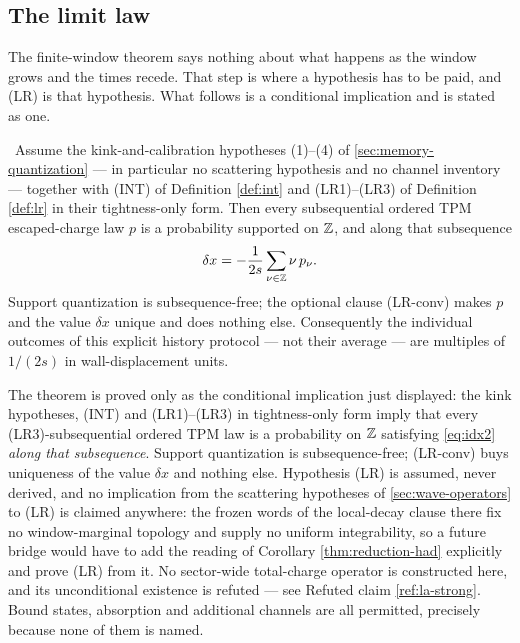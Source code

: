 \subsection{The limit law}

The finite-window theorem says nothing about what happens as the window grows
and the times recede. That step is where a hypothesis has to be paid, and
(LR) is that hypothesis. What follows is a conditional implication and is
stated as one.

\begin{theorem}
\label{thm:spec}
\statusProvedConditional\
Assume the kink-and-calibration hypotheses (1)--(4) of
\cref{sec:memory-quantization} --- in particular no scattering hypothesis and
no channel inventory --- together with (INT) of Definition \ref{def:int} and
(LR1)--(LR3) of Definition \ref{def:lr} in their tightness-only form. Then
every subsequential ordered TPM escaped-charge law $p$ is a probability
supported on $\mathbb{Z}$, and along that subsequence
\begin{equation}
  \delta x=-\frac{1}{2s}\sum_{\nu\in\mathbb{Z}}\nu\,p_\nu .
  \label{eq:idx2}
\end{equation}
Support quantization is subsequence-free; the optional clause (LR-conv) makes
$p$ and the value $\delta x$ unique and does nothing else. Consequently the
individual outcomes of this explicit history protocol --- not their average
--- are multiples of $1/(2s)$ in wall-displacement units.
\end{theorem}

\begin{scope}
The theorem is proved only as the conditional implication just displayed:
the kink hypotheses, (INT) and (LR1)--(LR3) in tightness-only form imply that
every (LR3)-subsequential ordered TPM law is a probability on $\mathbb{Z}$ satisfying
\eqref{eq:idx2} \emph{along that subsequence}. Support quantization is
subsequence-free; (LR-conv) buys uniqueness of the value $\delta x$ and
nothing else. Hypothesis (LR) is assumed, never derived, and no implication
from the scattering hypotheses of \cref{sec:wave-operators} to (LR) is
claimed anywhere: the frozen words of the local-decay clause there fix no
window-marginal topology and supply no uniform integrability, so a future
bridge would have to add the reading of Corollary \ref{thm:reduction-had}
explicitly and prove (LR) from it. No sector-wide total-charge operator is
constructed here, and its unconditional existence is refuted --- see Refuted
claim \ref{ref:la-strong}. Bound states, absorption and additional channels
are all permitted, precisely because none of them is named.
\end{scope}

